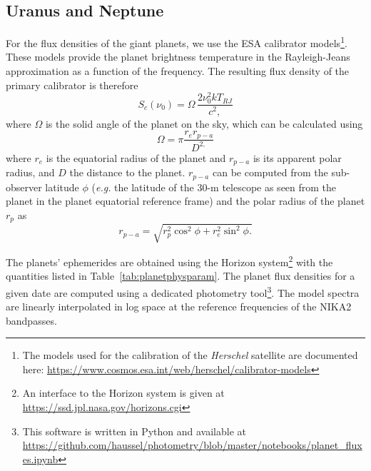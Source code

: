 \documentclass[traditionalabstract]{aa}
\begin{document}
{\begin{appendix}
\subsection{Uranus and Neptune}
\label{se:ref_flux_uranus_neptune}

For the flux densities of the giant planets, we use the ESA calibrator models\footnote{The models used for the calibration of the \emph{Herschel} satellite are documented here: \url{https://www.cosmos.esa.int/web/herschel/calibrator-models}}.
These models provide the planet brightness temperature in the
Rayleigh-Jeans approximation as a function of the frequency. The
resulting flux density of the primary calibrator is therefore 
\begin{equation}
S_c(\nu_0) = \Omega \, \frac{2 \nu_0^{2} k T_{RJ}}{c^2,}
\end{equation}
where $\Omega$ is the solid angle of the planet on the sky, %
which can be calculated using
%
\begin{equation}
\Omega = \pi \frac{r_{e} r_{p-a}}{D^{2,}} 
\label{eq:omega}
\end{equation}
where $r_{e}$ is the equatorial radius of the planet and $r_{p-a}$ is
its apparent polar radius, and $D$ the distance to the
planet. $r_{p-a}$ can be computed from the sub-observer latitude $\phi$
({\it e.g.} the latitude of the 30-m telescope as seen from the planet in the
planet equatorial reference frame) and the polar radius of the
planet $r_{p}$ as
\begin{equation}
r_{p-a} = \sqrt{r_{p}^2 \cos^{2}\phi + r_{e}^2 \sin^{2} \phi.}
\end{equation}

The planets' ephemerides are obtained using the
Horizon system\footnote{An interface to the Horizon system is given at \url{https://ssd.jpl.nasa.gov/horizons.cgi}} with the quantities
listed in Table~\ref{tab:planetphysparam}. The planet flux densities for a given date are computed using a dedicated
photometry tool\footnote{This software is written in Python and available at \url{https://github.com/haussel/photometry/blob/master/notebooks/planet_fluxes.ipynb}}. The model spectra are linearly interpolated in log space at the
reference frequencies of the NIKA2 bandpasses. 


\end{appendix}}
\end{document}
